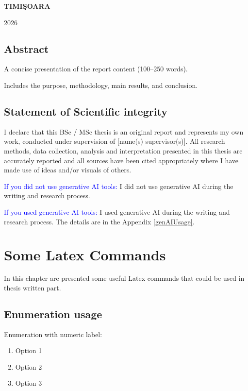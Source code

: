 \documentclass[12pt,a4paper]{book}
\theoremstyle{definition}
\theoremstyle{remark}
\begin{document}
\vfill
\begin{center}
{\bf TIMI\c SOARA

2026}
\end{center}

\newpage
\normalsize{}

\section*{Abstract} 
A concise presentation of the report content (100–250 words).


\noindent Includes the purpose, methodology, main results, and conclusion.


\newpage

\section*{Statement of Scientific integrity} 

I declare that this BSc / MSc thesis is an original report and represents my own work, conducted under supervision of [name(s) supervisor(s)]. All research methods, data collection, analysis and interpretation presented in this thesis are accurately reported and all sources have been cited appropriately where I have made use of ideas and/or visuals of others.

\textcolor{blue}{If you did not use generative AI tools:} I did not use generative AI during the writing and research process.

\textcolor{blue}{If you used generative AI tools:} I used generative AI during the writing and research process. The details are in the Appendix \ref{genAIUsage}.




\newpage
\normalsize{}

\tableofcontents


\chapter{Some Latex Commands}

In this chapter are presented some useful Latex commands that could be used in thesis written part.


\section{Enumeration usage}
Enumeration with numeric label:
\begin{enumerate}
    \item Option 1
    \item Option 2
    \item Option 3
\end{enumerate}
\end{document}
